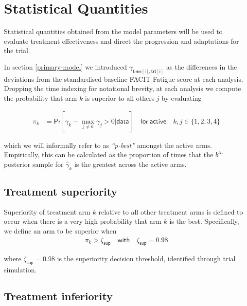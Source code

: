 \documentclass[
]{article}
\begin{document}
\clearpage

\hypertarget{statistical-quantities}{%
  \section{Statistical Quantities}\label{statistical-quantities}}

Statistical quantities obtained from the model parameters will be used to evaluate treatment effectiveness and direct the progression and adaptations for the trial.

In section \ref{primary-model} we introduced $\gamma_{\mathsf{time[i], trt[i]}}$ as the differences in the deviations from the standardised baseline FACIT-Fatigue score at each analysis.
Dropping the time indexing for notational brevity, at each analysis we compute the probability that arm $k$ is superior to all others $j$ by evaluating

\[
  \begin{aligned}
    \pi_{k} & = \mathsf{Pr}[\gamma_{k} - \max_{j\ne k} \gamma_j >0|\mathsf{data}] \quad \mathsf{for \  active} \quad k,j \in \{1, 2, 3, 4\}
  \end{aligned}
\]

which we will informally refer to as \textit{``p-best''} amongst the active arms.
Empirically, this can be calculated as the proportion of times that the $b^{th}$ posterior sample for $\widehat{\gamma}_k$ is the greatest across the active arms.

\hypertarget{treatment-superiority}{%
  \subsection{Treatment superiority}\label{treatment-superiority}}

Superiority of treatment arm $k$ relative to all other treatment arms is defined to occur when there is a very high probability that arm $k$ is the best.
Specifically, we define an arm to be superior when
\[
  \begin{aligned}
    \pi_{k} > \zeta_{\mathsf{sup}} \quad \mathsf{with} \quad \zeta_{\mathsf{sup}} = 0.98
  \end{aligned}
\]

where $\zeta_{\mathsf{sup}} = 0.98$ is the superiority decision threshold, identified through trial simulation.

\hypertarget{treatment-inferiority}{%
  \subsection{Treatment inferiority}\label{treatment-inferiority}}
\end{document}
